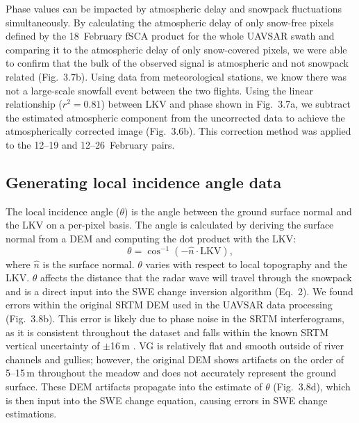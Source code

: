 Phase values can be impacted by atmospheric delay and snowpack fluctuations simultaneously. By calculating the atmospheric delay of only snow-free pixels defined by the 18~February fSCA product for the whole UAVSAR swath and comparing it to the atmospheric delay of only snow-covered pixels, we were able to confirm that the bulk of the observed signal is atmospheric and not snowpack related (Fig.~3.7b). Using data from meteorological stations, we know there was not a large-scale snowfall event between the two flights. Using the linear relationship ($r^{2} = 0.81$) between LKV and phase shown in Fig.~3.7a, we subtract the estimated atmospheric component from the uncorrected data to achieve the atmospherically corrected image (Fig.~3.6b). This correction method was applied to the 12--19  and 12--26~February pairs.

\hypertarget{ch3-methods-11}{\subsection{Generating local incidence angle data}\label{ch3-methods-11}}




The local incidence angle ($\theta$) is the angle between the ground surface normal and the LKV on a per-pixel basis. The angle is calculated by deriving the surface normal from a DEM and computing the dot product with the LKV:
\begin{equation}
\theta = \cos^{-1}(-\hat{n}\cdot \text{LKV}),
\end{equation}
where $\hat{n}$ is the surface normal. $\theta$ varies with respect to local topography and the LKV. $\theta$ affects the distance that the radar wave will travel through the snowpack and is a direct input into the SWE change inversion algorithm (Eq.~2). We found errors within the original SRTM DEM used in the UAVSAR data processing (Fig.~3.8b). This error is likely due to phase noise in the SRTM interferograms, as it is consistent throughout the dataset and falls within the known SRTM vertical uncertainty of $\pm$16\,m \citep{rodriguezGlobalAssessmentSRTM2006,sunValidationSurfaceHeight2003}. VG is relatively flat and smooth outside of river channels and gullies; however, the original DEM shows artifacts on the order of 5--15\,m throughout the meadow and does not accurately represent the ground surface. These DEM artifacts propagate into the estimate of $\theta$ (Fig.~3.8d), which is then input into the SWE change equation, causing errors in SWE change estimations.


